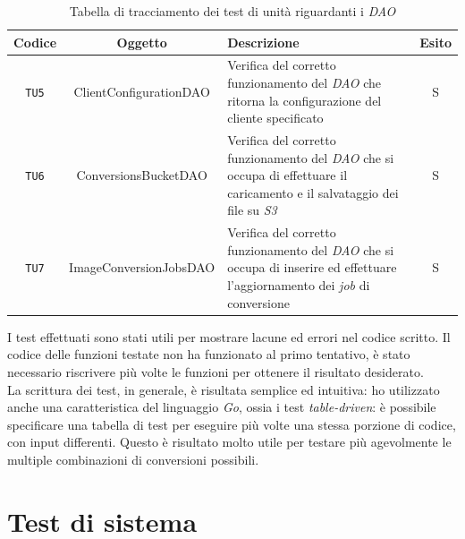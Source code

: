 \begin{table}[H]
    \caption{Tabella di tracciamento dei test di unità riguardanti i \emph{DAO}}
    \label{tab:test-dao}
    \begin{tabularx}{\textwidth}{|c|c|X|c|}
        \hline
        \textbf{Codice}                                          &
        \textbf{Oggetto}                                         & \textbf{Descrizione }  & \textbf{Esito} \\
        \hline
        \verb|TU5|                                               & ClientConfigurationDAO & Verifica del
        corretto funzionamento del \emph{DAO} che ritorna la configurazione del
        cliente specificato                                      & S                                       \\
        \hline
        \verb|TU6|                                               & ConversionsBucketDAO   & Verifica del
        corretto funzionamento del \emph{DAO} che si occupa di effettuare il
        caricamento e il salvataggio dei file su \emph{S3}       & S                                       \\
        \hline
        \verb|TU7|                                               & ImageConversionJobsDAO & Verifica del
        corretto funzionamento del \emph{DAO} che si occupa di inserire ed
        effettuare l'aggiornamento dei \emph{job} di conversione & S                                       \\
        \hline
    \end{tabularx}
\end{table}

I test effettuati sono stati utili per mostrare lacune ed errori nel codice
scritto. Il codice delle funzioni testate non ha funzionato al primo tentativo,
è stato necessario riscrivere più volte le funzioni per ottenere il risultato
desiderato. \\
La scrittura dei test, in generale, è risultata semplice ed intuitiva: ho
utilizzato anche una caratteristica del linguaggio \emph{Go}, ossia i test
\emph{table-driven}: è possibile specificare una tabella di test per eseguire
più volte una stessa porzione di codice, con input differenti. Questo è
risultato molto utile per testare più agevolmente le multiple combinazioni di
conversioni possibili.

\section{Test di sistema}

